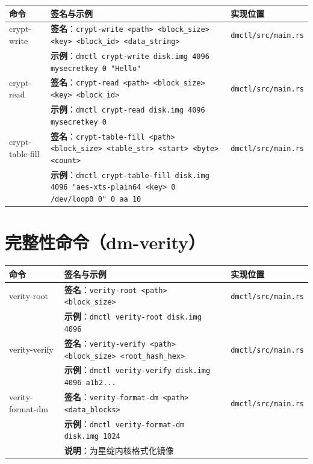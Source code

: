 \begin{longtable}{|p{}|p{}|p{}|}
\hline
\textbf{命令} & \textbf{签名与示例} & \textbf{实现位置} \\
\hline
\endhead
crypt-write & \textbf{签名}：\texttt{crypt-write <path> <block\_size> <key> <block\_id> <data\_string>} & \texttt{dmctl/src/main.rs} \\
 & \textbf{示例}：\texttt{dmctl crypt-write disk.img 4096 mysecretkey 0 "Hello"} & \\
\hline
crypt-read & \textbf{签名}：\texttt{crypt-read <path> <block\_size> <key> <block\_id>} & \texttt{dmctl/src/main.rs} \\
 & \textbf{示例}：\texttt{dmctl crypt-read disk.img 4096 mysecretkey 0} & \\
\hline
crypt-table-fill & \textbf{签名}：\texttt{crypt-table-fill <path> <block\_size> <table\_str> <start> <byte> <count>} & \texttt{dmctl/src/main.rs} \\
 & \textbf{示例}：\texttt{dmctl crypt-table-fill disk.img 4096 "aes-xts-plain64 <key> 0 /dev/loop0 0" 0 aa 10} & \\
\hline
\end{longtable}

\section*{完整性命令（dm-verity）}

\begin{longtable}{|p{}|p{}|p{}|}
\hline
\textbf{命令} & \textbf{签名与示例} & \textbf{实现位置} \\
\hline
\endhead
verity-root & \textbf{签名}：\texttt{verity-root <path> <block\_size>} & \texttt{dmctl/src/main.rs} \\
 & \textbf{示例}：\texttt{dmctl verity-root disk.img 4096} & \\
\hline
verity-verify & \textbf{签名}：\texttt{verity-verify <path> <block\_size> <root\_hash\_hex>} & \texttt{dmctl/src/main.rs} \\
 & \textbf{示例}：\texttt{dmctl verity-verify disk.img 4096 a1b2...} & \\
\hline
verity-format-dm & \textbf{签名}：\texttt{verity-format-dm <path> <data\_blocks>} & \texttt{dmctl/src/main.rs} \\
 & \textbf{示例}：\texttt{dmctl verity-format-dm disk.img 1024} & \\
 & \textbf{说明}：为星绽内核格式化镜像 & \\
\hline
\end{longtable}

